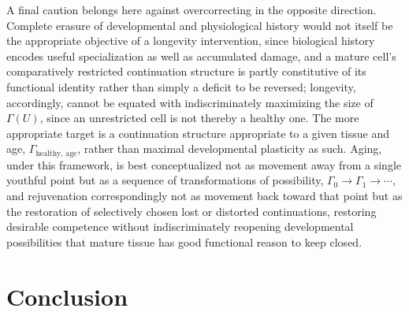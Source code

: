 \documentclass[11pt]{article}
\begin{document}
A final caution belongs here against overcorrecting in the opposite direction. Complete erasure of developmental and physiological history would not itself be the appropriate objective of a longevity intervention, since biological history encodes useful specialization as well as accumulated damage, and a mature cell's comparatively restricted continuation structure is partly constitutive of its functional identity rather than simply a deficit to be reversed; longevity, accordingly, cannot be equated with indiscriminately maximizing the size of $\Gamma(U)$, since an unrestricted cell is not thereby a healthy one. The more appropriate target is a continuation structure appropriate to a given tissue and age, $\Gamma_{\text{healthy, age}}$, rather than maximal developmental plasticity as such. Aging, under this framework, is best conceptualized not as movement away from a single youthful point but as a sequence of transformations of possibility, $\Gamma_0 \to \Gamma_1 \to \cdots$, and rejuvenation correspondingly not as movement back toward that point but as the restoration of selectively chosen lost or distorted continuations, restoring desirable competence without indiscriminately reopening developmental possibilities that mature tissue has good functional reason to keep closed.

\section*{Conclusion}
\end{document}
